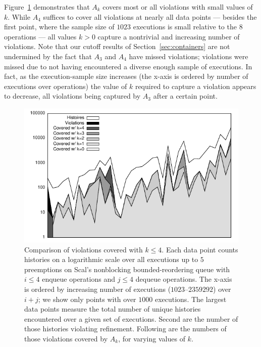 Figure~\ref{fig:data:coverage} demonstrates that $A_k$ covers most or all
violations with small values of $k$. While $A_4$ suffices to cover all
violations at nearly all data points --- besides the first point, where the
sample size of $1023$ executions is small relative to the $8$ operations ---
all values $k > 0$ capture a nontrivial and increasing number of violations.
Note that our cutoff results of Section~\ref{sec:containers} are not undermined
by the fact that $A_3$ and $A_4$ have missed violations; violations were missed
due to not having encountered a diverse enough sample of executions. In fact,
as the execution-sample size increases (the x-axis is ordered by number of
executions over operations) the value of $k$ required to capture a violation
appears to decrease, all violations being captured by $A_3$ after a certain
point.


\begin{figure}[t]
  \centering
  \includegraphics[width=\linewidth]{figures/coverage-bkq-2-barriers}
  \caption{Comparison of violations covered with
    $k \le 4$. Each data point counts histories on a logarithmic scale over
    all executions up to $5$ preemptions on Scal's nonblocking
    bounded-reordering queue with $i \le 4$ enqueue operations and $j \le 4$
    dequeue operations. The x-axis is ordered by increasing number of
    executions ($1023$--$2359292$) over $i\!+\!j$; we show only points with over
    $1000$ executions. The largest data points measure the total
    number of unique histories encountered over a given set of executions.
    Second are the number of those histories violating refinement.
    Following are the
    numbers of those violations covered by $A_k$, for varying values of $k$.
  }
  \label{fig:data:coverage}
\end{figure}

